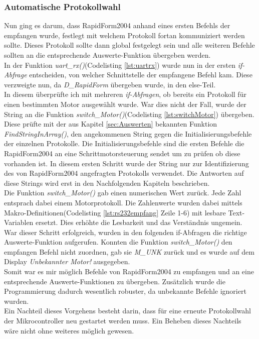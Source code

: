 \subsubsection{Automatische Protokollwahl}
\label{AutoProtokoll}
Nun ging es darum, dass RapidForm2004 anhand eines ersten Befehls der empfangen wurde, festlegt mit welchem Protokoll fortan kommuniziert werden sollte. Dieses Protokoll sollte dann global festgelegt sein und alle weiteren Befehle sollten an die entsprechende Auswerte-Funktion übergeben werden.\\
In der Funktion \emph{uart\_rx()}(Codelisting \ref{lst:uartrx}) wurde nun in der ersten \emph{if-Abfrage} entscheiden, von welcher Schnittstelle der empfangene Befehl kam. Diese verzweigte nun, da \emph{D\_RapidForm} übergeben wurde, in den else-Teil.\\
In diesem überprüfte ich mit mehreren \emph{if-Abfragen}, ob bereits ein Protokoll für einen bestimmten Motor ausgewählt wurde.
War dies nicht der Fall, wurde der String an die Funktion \emph{switch\_Motor()}(Codelisting \ref{lst:switchMotor}) übergeben. Diese prüfte mit der aus Kapitel \ref{sec:Auswerten} bekannten Funktion \emph{FindStringInArray()}, den angekommenen String gegen die Initialisierungsbefehle der einzelnen Protokolle. Die Initialisierungsbefehle sind die ersten Befehle die RapidForm2004 an eine Schrittmotorsteuerung sendet um zu prüfen ob diese vorhanden ist. In diesem ersten Schritt wurde der String nur zur Identifizierung des von RapidForm2004 angefragten Protokolls verwendet. Die Antworten auf diese Strings wird erst in den Nachfolgenden Kapiteln beschrieben.\\
Die Funktion \emph{switch\_Motor()} gab einen numerischen Wert zurück. Jede Zahl entsprach dabei einem Motorprotokoll. Die Zahlenwerte wurden dabei mittels Makro-Definitionen(Codelisting \ref{lst:rs232empfang} Zeile 1-6) mit lesbare Text-Variablen ersetzt. Dies erhöhte die Lesbarkeit und das Verständnis ungemein.\\
War dieser Schritt erfolgreich, wurden in den folgenden if-Abfragen die richtige Auswerte-Funktion aufgerufen. Konnten die Funktion \emph{switch\_Motor()} den empfangen Befehl nicht zuordnen, gab sie \emph{M\_UNK} zurück und es wurde auf dem Display \emph{Unbekannter Motor!} ausgegeben.\\
Somit war es mir möglich Befehle von RapidForm2004 zu empfangen und an eine entsprechende Auswerte-Funktionen zu übergeben. Zusätzlich wurde die Programmierung dadurch wesentlich robuster, da unbekannte Befehle ignoriert wurden.\\
Ein Nachteil dieses Vorgehens besteht darin, dass für eine erneute Protokollwahl der Mikrocontroller neu gestartet werden muss. Ein Beheben dieses Nachteils wäre nicht ohne weiteres möglich gewesen.

